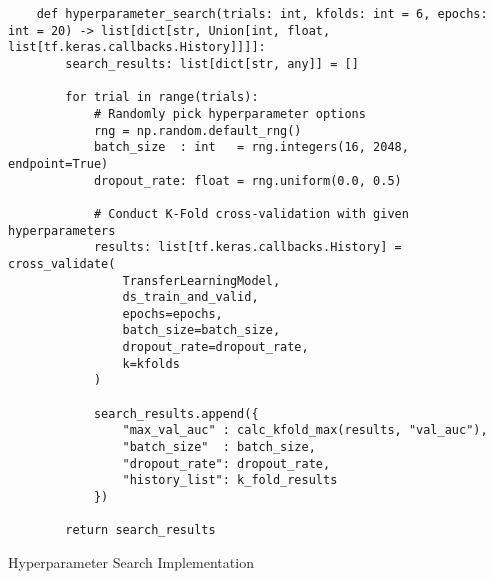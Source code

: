 \begin{listing}[H]
    \begin{verbatim}
    def hyperparameter_search(trials: int, kfolds: int = 6, epochs: int = 20) -> list[dict[str, Union[int, float, list[tf.keras.callbacks.History]]]]:
        search_results: list[dict[str, any]] = []

        for trial in range(trials):
            # Randomly pick hyperparameter options
            rng = np.random.default_rng()
            batch_size  : int   = rng.integers(16, 2048, endpoint=True)
            dropout_rate: float = rng.uniform(0.0, 0.5)

            # Conduct K-Fold cross-validation with given hyperparameters
            results: list[tf.keras.callbacks.History] = cross_validate(
                TransferLearningModel,
                ds_train_and_valid,
                epochs=epochs,
                batch_size=batch_size,
                dropout_rate=dropout_rate,
                k=kfolds
            )

            search_results.append({
                "max_val_auc" : calc_kfold_max(results, "val_auc"),
                "batch_size"  : batch_size,
                "dropout_rate": dropout_rate,
                "history_list": k_fold_results
            })

        return search_results
    \end{verbatim}
\caption{Hyperparameter Search Implementation}\label{listing:hyperparam-search}
\end{listing}